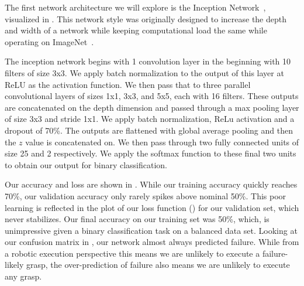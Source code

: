 The first network architecture we will explore is the Inception Network~\cite{szegedy2015going}, visualized in . 
This network style was originally designed to increase the depth and width of a network while keeping computational load the same while operating on ImageNet~\cite{deng2009imagenet}. 

The inception network begins with 1 convolution layer in the beginning with 10 filters of size 3x3. 
We apply batch normalization to the output of this layer at ReLU as the activation function. 
We then pass that to three parallel convolutional layers of sizes 1x1, 3x3, and 5x5, each with 16 filters. 
These outputs are concatenated on the depth dimension and passed through a max pooling layer of size 3x3 and stride 1x1.
We apply batch normalization, ReLu activation and a dropout of 70\%. 
The outputs are flattened with global average pooling and then the $z$ value is concatenated on. 
We then pass through two fully connected units of size 25 and 2 respectively.  
We apply the softmax function to these final two units to obtain our output for binary classification.

Our accuracy and loss are shown in . 
While our training accuracy quickly reaches 70\%, our validation accuracy only rarely spikes above nominal 50\%. 
This poor learning is reflected in the plot of our loss function () for our validation set, which never stabilizes. 
Our final accuracy on our training set was 50\%, which, is unimpressive given a binary classification task on a balanced data set. 
Looking at our confusion matrix in , our network almost always predicted failure. 
While from a robotic execution perspective this means we are unlikely to execute a failure-likely grasp, the over-prediction of failure also means we are unlikely to execute any grasp. 

